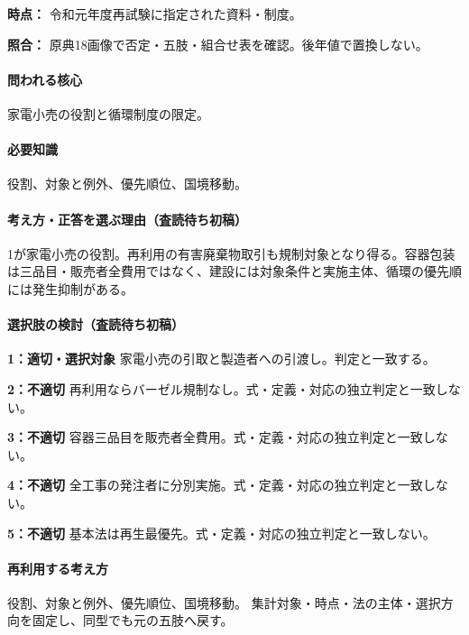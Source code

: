 \noindent\textbf{時点：} 令和元年度再試験に指定された資料・制度。\par

\noindent\textbf{照合：} 原典18画像で否定・五肢・組合せ表を確認。後年値で置換しない。\par

\paragraph{問われる核心} 家電小売の役割と循環制度の限定。

\paragraph{必要知識} 役割、対象と例外、優先順位、国境移動。

\paragraph{考え方・正答を選ぶ理由（査読待ち初稿）} 1が家電小売の役割。再利用の有害廃棄物取引も規制対象となり得る。容器包装は三品目・販売者全費用ではなく、建設には対象条件と実施主体、循環の優先順には発生抑制がある。

\paragraph{選択肢の検討（査読待ち初稿）}\mbox{}\par

\noindent\textbf{1：適切・選択対象} 家電小売の引取と製造者への引渡し。判定と一致する。\par

\noindent\textbf{2：不適切} 再利用ならバーゼル規制なし。式・定義・対応の独立判定と一致しない。\par

\noindent\textbf{3：不適切} 容器三品目を販売者全費用。式・定義・対応の独立判定と一致しない。\par

\noindent\textbf{4：不適切} 全工事の発注者に分別実施。式・定義・対応の独立判定と一致しない。\par

\noindent\textbf{5：不適切} 基本法は再生最優先。式・定義・対応の独立判定と一致しない。\par

\paragraph{再利用する考え方} 役割、対象と例外、優先順位、国境移動。 集計対象・時点・法の主体・選択方向を固定し、同型でも元の五肢へ戻す。

